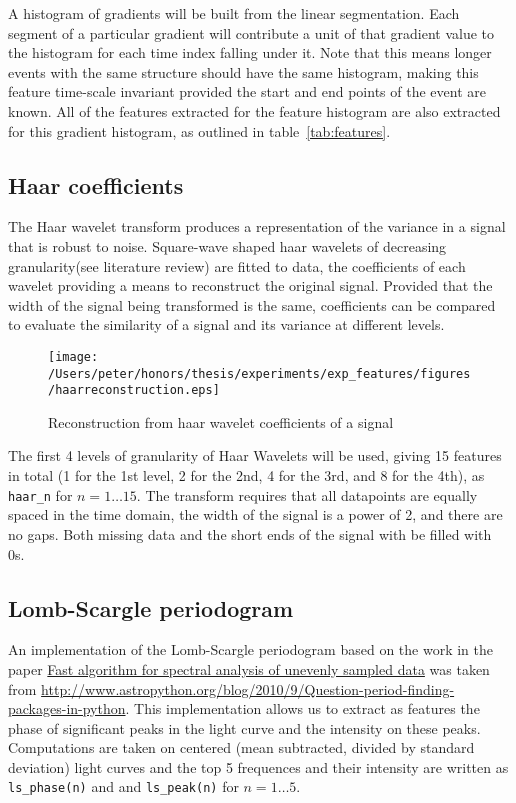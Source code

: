 	A histogram of gradients will be built from the linear segmentation. Each segment of a particular gradient will contribute a unit of that gradient value to the histogram for each time index falling under it. Note that this means longer events with the same structure should have the same histogram, making this feature time-scale invariant provided the start and end points of the event are known. All of the features extracted for the feature histogram are also extracted for this gradient histogram, as outlined in table~\ref{tab:features}.
	
	\subsection{Haar coefficients}
	The Haar wavelet transform produces a representation of the variance in a signal that is robust to noise. Square-wave shaped haar wavelets of decreasing granularity(see literature review) are fitted to data, the coefficients of each wavelet providing a means to reconstruct the original signal. Provided that the width of the signal being transformed is the same, coefficients can be compared to evaluate the similarity of a signal and its variance at different levels.
	
	\begin{figure}[ht!]
		\label{fig:haarwaveletexample}
		\centering
		\texttt{[image: /Users/peter/honors/thesis/experiments/exp\_features/figures/haarreconstruction.eps]}
		\caption{Reconstruction from haar wavelet coefficients of a signal}
	\end{figure}
	
	The first 4 levels of granularity of Haar Wavelets will be used, giving 15 features in total (1 for the 1st level, 2 for the 2nd, 4 for the 3rd, and 8 for the 4th), as \verb#haar_n# for $n = 1 \ldots 15$. The transform requires that all datapoints are equally spaced in the time domain, the width of the signal is a power of 2, and there are no gaps. Both missing data and the short ends of the signal with be filled with 0s.
	

	
	\subsection{Lomb-Scargle periodogram}
	An implementation of the Lomb-Scargle periodogram based on the work in the paper \href{http://adsabs.harvard.edu/abs/1989ApJ...338..277P}{Fast algorithm for spectral analysis of unevenly sampled data} was taken from \url{http://www.astropython.org/blog/2010/9/Question-period-finding-packages-in-python}. This implementation allows us to extract as features the phase of significant peaks in the light curve and the intensity on these peaks. Computations are taken on centered (mean subtracted, divided by standard deviation) light curves and the top 5 frequences and their intensity are written as \verb#ls_phase(n)# and and \verb#ls_peak(n)# for $n = 1\ldots 5$. \\ %
	
